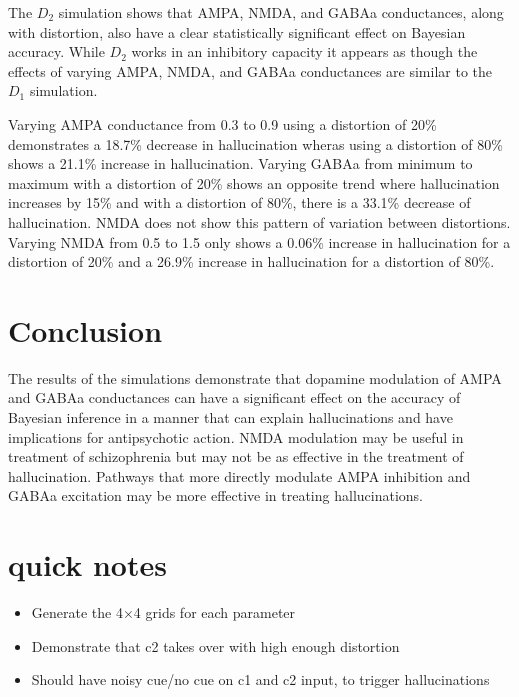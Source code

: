 \documentclass[twocolumn]{article}
\begin{document}
The $D_2$ simulation shows that AMPA, NMDA, and GABAa conductances, along with distortion, also have a clear statistically significant effect on Bayesian accuracy.
While $D_2$ works in an inhibitory capacity it appears as though the effects of varying AMPA, NMDA, and GABAa conductances are similar to the $D_1$ simulation.

Varying AMPA conductance from 0.3 to 0.9 using a distortion of 20\% demonstrates a 18.7\% decrease in hallucination wheras using a distortion of 80\% shows a 21.1\% increase in hallucination.
Varying GABAa from minimum to maximum with a distortion of 20\% shows an opposite trend where hallucination increases by 15\% and with a distortion of 80\%, there is a 33.1\% decrease of hallucination.
NMDA does not show this pattern of variation between distortions.
Varying NMDA from 0.5 to 1.5 only shows a 0.06\% increase in hallucination for a distortion of 20\% and a 26.9\% increase in hallucination for a distortion of 80\%.

\section{Conclusion}

The results of the simulations demonstrate that dopamine modulation of AMPA and GABAa conductances can have a significant effect on the accuracy of Bayesian inference in a manner that can explain hallucinations and have implications for antipsychotic action.
NMDA modulation may be useful in treatment of schizophrenia but may not be as effective in the treatment of hallucination. 
Pathways that more directly modulate AMPA inhibition and GABAa excitation may be more effective in treating hallucinations.

\section{quick notes}
\begin{itemize}
    \item Generate the 4$\times$4 grids for each parameter
    \item Demonstrate that c2 takes over with high enough distortion
    \item Should have noisy cue/no cue on c1 and c2 input, to trigger hallucinations
\end{itemize}



\end{document}
